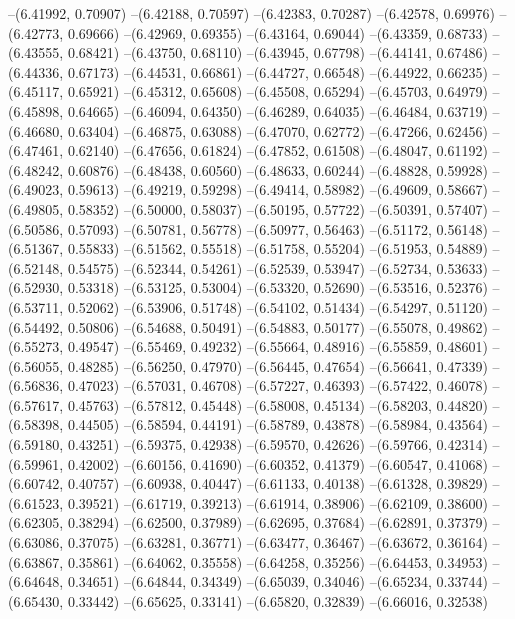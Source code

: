 --(6.41992, 0.70907)
--(6.42188, 0.70597)
--(6.42383, 0.70287)
--(6.42578, 0.69976)
--(6.42773, 0.69666)
--(6.42969, 0.69355)
--(6.43164, 0.69044)
--(6.43359, 0.68733)
--(6.43555, 0.68421)
--(6.43750, 0.68110)
--(6.43945, 0.67798)
--(6.44141, 0.67486)
--(6.44336, 0.67173)
--(6.44531, 0.66861)
--(6.44727, 0.66548)
--(6.44922, 0.66235)
--(6.45117, 0.65921)
--(6.45312, 0.65608)
--(6.45508, 0.65294)
--(6.45703, 0.64979)
--(6.45898, 0.64665)
--(6.46094, 0.64350)
--(6.46289, 0.64035)
--(6.46484, 0.63719)
--(6.46680, 0.63404)
--(6.46875, 0.63088)
--(6.47070, 0.62772)
--(6.47266, 0.62456)
--(6.47461, 0.62140)
--(6.47656, 0.61824)
--(6.47852, 0.61508)
--(6.48047, 0.61192)
--(6.48242, 0.60876)
--(6.48438, 0.60560)
--(6.48633, 0.60244)
--(6.48828, 0.59928)
--(6.49023, 0.59613)
--(6.49219, 0.59298)
--(6.49414, 0.58982)
--(6.49609, 0.58667)
--(6.49805, 0.58352)
--(6.50000, 0.58037)
--(6.50195, 0.57722)
--(6.50391, 0.57407)
--(6.50586, 0.57093)
--(6.50781, 0.56778)
--(6.50977, 0.56463)
--(6.51172, 0.56148)
--(6.51367, 0.55833)
--(6.51562, 0.55518)
--(6.51758, 0.55204)
--(6.51953, 0.54889)
--(6.52148, 0.54575)
--(6.52344, 0.54261)
--(6.52539, 0.53947)
--(6.52734, 0.53633)
--(6.52930, 0.53318)
--(6.53125, 0.53004)
--(6.53320, 0.52690)
--(6.53516, 0.52376)
--(6.53711, 0.52062)
--(6.53906, 0.51748)
--(6.54102, 0.51434)
--(6.54297, 0.51120)
--(6.54492, 0.50806)
--(6.54688, 0.50491)
--(6.54883, 0.50177)
--(6.55078, 0.49862)
--(6.55273, 0.49547)
--(6.55469, 0.49232)
--(6.55664, 0.48916)
--(6.55859, 0.48601)
--(6.56055, 0.48285)
--(6.56250, 0.47970)
--(6.56445, 0.47654)
--(6.56641, 0.47339)
--(6.56836, 0.47023)
--(6.57031, 0.46708)
--(6.57227, 0.46393)
--(6.57422, 0.46078)
--(6.57617, 0.45763)
--(6.57812, 0.45448)
--(6.58008, 0.45134)
--(6.58203, 0.44820)
--(6.58398, 0.44505)
--(6.58594, 0.44191)
--(6.58789, 0.43878)
--(6.58984, 0.43564)
--(6.59180, 0.43251)
--(6.59375, 0.42938)
--(6.59570, 0.42626)
--(6.59766, 0.42314)
--(6.59961, 0.42002)
--(6.60156, 0.41690)
--(6.60352, 0.41379)
--(6.60547, 0.41068)
--(6.60742, 0.40757)
--(6.60938, 0.40447)
--(6.61133, 0.40138)
--(6.61328, 0.39829)
--(6.61523, 0.39521)
--(6.61719, 0.39213)
--(6.61914, 0.38906)
--(6.62109, 0.38600)
--(6.62305, 0.38294)
--(6.62500, 0.37989)
--(6.62695, 0.37684)
--(6.62891, 0.37379)
--(6.63086, 0.37075)
--(6.63281, 0.36771)
--(6.63477, 0.36467)
--(6.63672, 0.36164)
--(6.63867, 0.35861)
--(6.64062, 0.35558)
--(6.64258, 0.35256)
--(6.64453, 0.34953)
--(6.64648, 0.34651)
--(6.64844, 0.34349)
--(6.65039, 0.34046)
--(6.65234, 0.33744)
--(6.65430, 0.33442)
--(6.65625, 0.33141)
--(6.65820, 0.32839)
--(6.66016, 0.32538)
